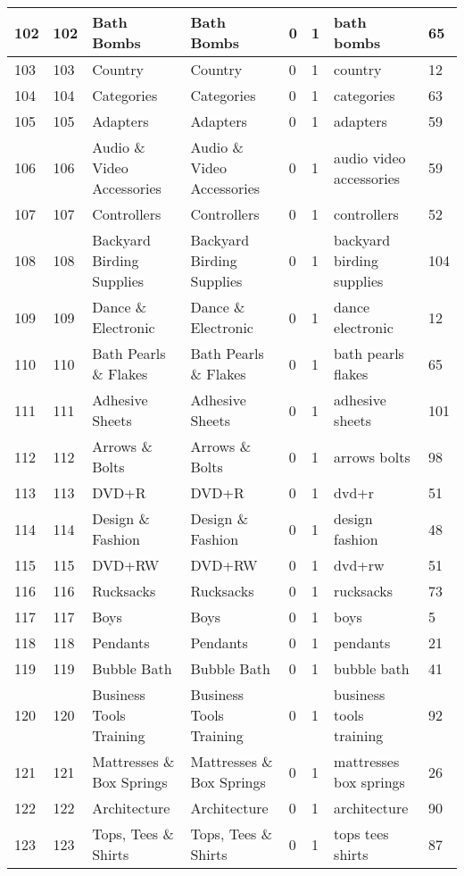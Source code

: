 \begin{longtable}{|l|l|l|l|l|l|l|l|}
102 & 102 & Bath Bombs & Bath Bombs & 0 & 1 & bath bombs & 65 \\ \hline 
103 & 103 & Country & Country & 0 & 1 & country & 12 \\ \hline 
104 & 104 & Categories & Categories & 0 & 1 & categories & 63 \\ \hline 
105 & 105 & Adapters & Adapters & 0 & 1 & adapters & 59 \\ \hline 
106 & 106 & Audio \& Video Accessories & Audio \& Video Accessories & 0 & 1 & audio video accessories & 59 \\ \hline 
107 & 107 & Controllers & Controllers & 0 & 1 & controllers & 52 \\ \hline 
108 & 108 & Backyard Birding Supplies & Backyard Birding Supplies & 0 & 1 & backyard birding supplies & 104 \\ \hline 
109 & 109 & Dance \& Electronic & Dance \& Electronic & 0 & 1 & dance electronic & 12 \\ \hline 
110 & 110 & Bath Pearls \& Flakes & Bath Pearls \& Flakes & 0 & 1 & bath pearls flakes & 65 \\ \hline 
111 & 111 & Adhesive Sheets & Adhesive Sheets & 0 & 1 & adhesive sheets & 101 \\ \hline 
112 & 112 & Arrows \& Bolts & Arrows \& Bolts & 0 & 1 & arrows bolts & 98 \\ \hline 
113 & 113 & DVD+R & DVD+R & 0 & 1 & dvd+r & 51 \\ \hline 
114 & 114 & Design \& Fashion & Design \& Fashion & 0 & 1 & design fashion & 48 \\ \hline 
115 & 115 & DVD+RW & DVD+RW & 0 & 1 & dvd+rw & 51 \\ \hline 
116 & 116 & Rucksacks & Rucksacks & 0 & 1 & rucksacks & 73 \\ \hline 
117 & 117 & Boys & Boys & 0 & 1 & boys & 5 \\ \hline 
118 & 118 & Pendants & Pendants & 0 & 1 & pendants & 21 \\ \hline 
119 & 119 & Bubble Bath & Bubble Bath & 0 & 1 & bubble bath & 41 \\ \hline 
120 & 120 & Business Tools Training & Business Tools Training & 0 & 1 & business tools training & 92 \\ \hline 
121 & 121 & Mattresses \& Box Springs & Mattresses \& Box Springs & 0 & 1 & mattresses box springs & 26 \\ \hline 
122 & 122 & Architecture & Architecture & 0 & 1 & architecture & 90 \\ \hline 
123 & 123 & Tops, Tees \& Shirts & Tops, Tees \& Shirts & 0 & 1 & tops tees shirts & 87 \\ \hline 

\end{longtable}
